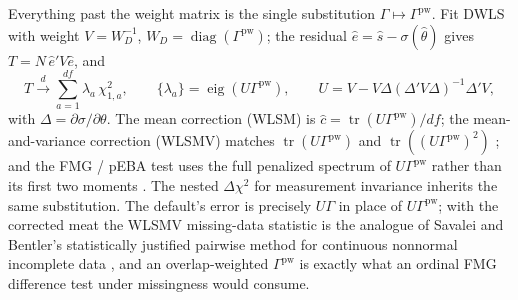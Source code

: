 \documentclass[11pt]{article}
\newcommand{\tr}{\operatorname{tr}}
\newcommand{\pw}{\mathrm{pw}}
\theoremstyle{plain}
\theoremstyle{remark}
\begin{document}
Everything past the weight matrix is the single substitution
$\Gamma\mapsto\Gamma^{\pw}$. Fit DWLS with weight $V=W_D^{-1}$,
$W_D=\operatorname{diag}(\Gamma^{\pw})$; the residual
$\hat e=\hat s-\sigma(\hat\theta)$ gives $T=N\,\hat e'V\hat e$, and
\[
  T \xrightarrow{d} \sum_{a=1}^{df}\lambda_a\,\chi^2_{1,a},
  \qquad
  \{\lambda_a\}=\operatorname{eig}(U\Gamma^{\pw}),
  \qquad
  U = V - V\Delta(\Delta'V\Delta)^{-1}\Delta'V,
\]
with $\Delta=\partial\sigma/\partial\theta$. The mean correction (WLSM) is
$\hat c=\tr(U\Gamma^{\pw})/df$; the mean-and-variance correction (WLSMV) matches
$\tr(U\Gamma^{\pw})$ and $\tr((U\Gamma^{\pw})^2)$ \cite{satorrabentler2001}; and
the FMG / pEBA test uses the full penalized spectrum of $U\Gamma^{\pw}$ rather
than its first two moments \cite{fmg2025}. The nested $\Delta\chi^2$ for
measurement invariance inherits the same substitution. The default's error is
precisely $U\Gamma$ in place of $U\Gamma^{\pw}$; with the corrected meat the
WLSMV missing-data statistic is the analogue of Savalei and Bentler's
statistically justified pairwise method for continuous nonnormal incomplete data
\cite{savaleibentler2005}, and an overlap-weighted $\Gamma^{\pw}$ is exactly what
an ordinal FMG difference test under missingness would consume.
\end{document}
